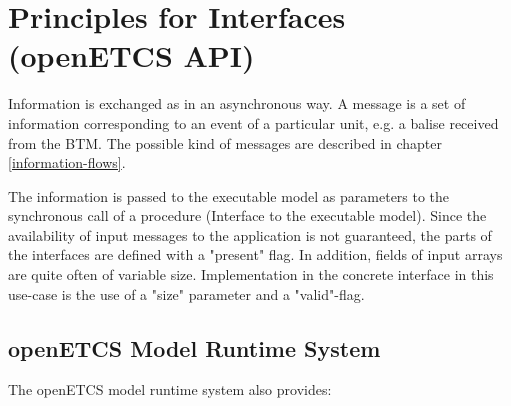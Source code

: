 \documentclass{template/openetcs_report}
\begin{document}
\section{Principles for Interfaces (openETCS \gls{API})}


Information  is exchanged as  in an asynchronous way. A message is a set
of information corresponding to an event of a particular unit, e.g. a
balise received from the \gls{BTM}. The possible kind of messages are
described in chapter \ref{information-flows}.

The information is passed to the executable model as parameters to the synchronous call of a procedure (Interface to the executable model). Since the availability of input messages to the application is not guaranteed, the parts of the interfaces are defined with a "present" flag. In addition, fields of input arrays are quite often of variable size. Implementation in the concrete interface in this use-case is the use of a "size" parameter and a "valid"-flag.


\subsection{openETCS Model Runtime System}
The openETCS model runtime system also provides:
\end{document}
